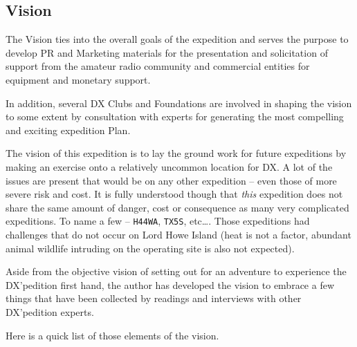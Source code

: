 \documentclass[11pt]{article}
\begin{document}
\subsection{Vision}
   The Vision ties into the overall goals of the expedition and serves
the purpose to develop PR and Marketing materials for the presentation
and solicitation of support from the amateur radio community and 
commercial entities for equipment and monetary support.
\par
In addition, several DX Clubs and Foundations are involved in 
shaping the vision to some extent by consultation with experts
for generating the most compelling and exciting expedition Plan.
\par
The vision of this expedition is to lay the ground work for future
expeditions by making an exercise onto a relatively uncommon location
for DX.   A lot of the issues are present that would be on any other
expedition -- even those of more severe risk and cost.  It is fully
understood though that {\textit{this}} expedition does not share
the same amount of danger, cost or consequence as many very
complicated expeditions.  To name a few -- {\texttt{H44WA}}, {\texttt{TX5S}},
etc\ldots.  Those expeditions had challenges that do not occur on
Lord Howe Island (heat is not a factor, abundant animal wildlife
intruding on the operating site is also not expected).
\par
Aside from the objective vision of setting out for an adventure
to experience the DX'pedition first hand, the author has developed
the vision to embrace a few things that have been collected by readings
and interviews with other DX'pedition experts.
\par
Here is a quick list of those elements of the vision.
\end{document}
